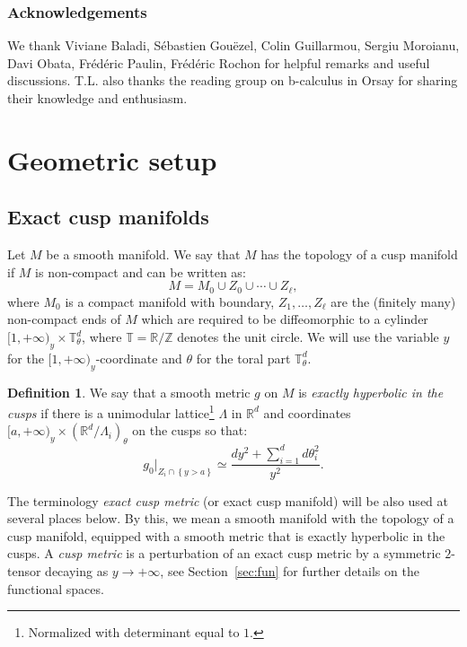 \documentclass[10pt]{amsart}
\newcommand{\R}{\mathbb{R}}
\newcommand{\T}{\mathbb{T}}
\newcommand{\Z}{\mathbb{Z}}
\theoremstyle{plain}
\theoremstyle{definition}
\newtheorem{definition}{Definition}[section]
\begin{document}
\subsubsection*{Acknowledgements}
We thank Viviane Baladi, Sébastien Gouëzel, Colin Guillarmou, Sergiu Moroianu, Davi Obata, Frédéric Paulin, Frédéric Rochon for helpful \hbox{remarks} and useful discussions. T.L. also thanks the reading group on b-calculus in Orsay for sharing their knowledge and enthusiasm.

\section{Geometric setup}
\label{sec:geom-in-cusps}

\subsection{Exact cusp manifolds}

\label{ssection:cusp}

Let $M$ be a smooth manifold. We say that $M$ has the topology of a cusp manifold if $M$ is non-compact and can be written as:
\[
M = M_0 \cup Z_0 \cup \cdots \cup Z_\ell,
\]
where $M_0$ is a compact manifold with boundary, $Z_1,\dots, Z_\ell$ are the (finitely many) non-compact ends of $M$ which are required to be diffeomorphic to a cylinder $[1,+\infty)_y \times \T^d_\theta$, where $\T=\R/\Z$ denotes the unit circle. We will use the variable $y$ for the $[1,+\infty)_y$-coordinate and $\theta$ for the toral part $\T^d_\theta$.

\begin{definition}
\label{definition:hyperbolic}
We say that a smooth metric $g$ on $M$ is \emph{exactly hyperbolic in the cusps} if there is a unimodular lattice\footnote{Normalized with determinant equal to $1$.} $\Lambda$ in $\R^d$ and coordinates $[a,+\infty)_y \times (\R^d/\Lambda_i)_\theta$ on the cusps so that:\vspace*{-3pt}
\[
g_0|_{Z_i \cap \left\{y > a \right\}} \simeq \dfrac{dy^2+ \sum_{i=1}^d d\theta_i^2}{y^2}.
\]
\end{definition}

The terminology \emph{exact cusp metric} (or exact cusp manifold) will be also used at several places below. By this, we mean a smooth manifold with the topology of a cusp manifold, equipped with a smooth metric that is exactly hyperbolic in the cusps. A \emph{cusp metric} is a perturbation of an exact cusp metric by a symmetric $2$-tensor decaying as $y \to +\infty$, see Section~\ref{sec:fun} for further details on the functional spaces.
\end{document}
